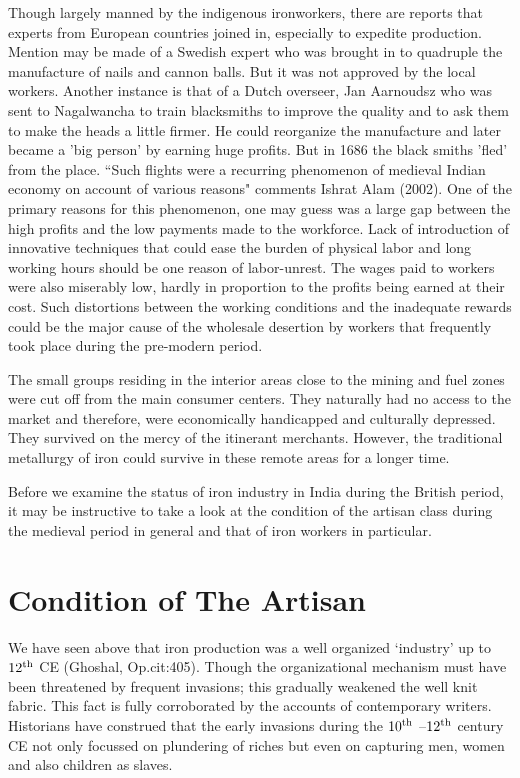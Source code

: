 Though largely manned by the indigenous ironworkers, there are reports that experts from European countries joined in, especially to expedite production. Mention may be made of a Swedish expert who was brought in to quadruple the manufacture of nails and cannon balls. But it was not approved by the local workers. Another instance is that of a Dutch overseer, Jan Aarnoudsz who was sent to Nagalwancha to train blacksmiths to improve the quality and to ask them to make the heads a little firmer. He could reorganize the manufacture and later became a 'big person' by earning huge profits. But in 1686 the black smiths 'fled' from the place. “Such flights were a recurring phenomenon of medieval Indian economy on account of various reasons" comments Ishrat Alam (2002). One of the primary reasons for this phenomenon, one may guess was a large gap between the high profits and the low payments made to the workforce. Lack of introduction of innovative techniques that could ease the burden of physical labor and long working hours should be one reason of labor-unrest. The wages paid to workers were also miserably low, hardly in proportion to the profits being earned at their cost. Such distortions between the working conditions and the inadequate rewards could be the major cause of the wholesale desertion by workers that frequently took place during the pre-modern period.  

The small groups residing in the interior areas close to the mining and fuel zones were cut off from the main consumer centers. They naturally had no access to the market and therefore, were economically handicapped and culturally depressed. They survived on the mercy of the itinerant merchants. However, the traditional metallurgy of iron could survive in these remote areas for a longer time.

Before we examine the status of iron industry in India during the British period, it may be instructive to take a look at the condition of the artisan class during the medieval period in general and that of iron workers in particular. 

\section*{Condition of The Artisan}\label{section-4}

We have seen above that iron production was a well organized ‘industry’ up to $12^{\rm th}$ CE (Ghoshal, Op.cit:405). Though the organizational mechanism must have been threatened by frequent invasions; this gradually weakened the well knit fabric. This fact is fully corroborated by the accounts of contemporary writers. Historians have construed that the early invasions during the $10^{\rm th}$ –$12^{\rm th}$ century CE not only focussed on plundering of riches but even on capturing men, women and also children as slaves. 

